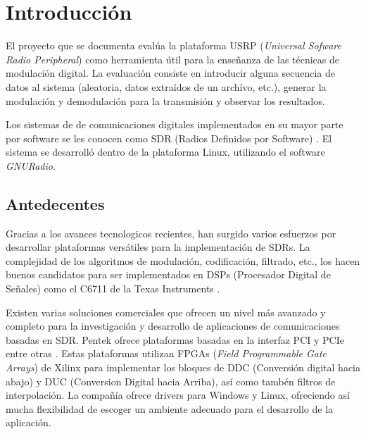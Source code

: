 \chapter{Introducci\'on}

El proyecto que se documenta eval\'ua la plataforma USRP (\emph{Universal Sofware Radio Peripheral}) como herramienta \'util
para la ense\~nanza de las t\'ecnicas de modulaci\'on digital. La evaluaci\'on consiste en introducir alguna secuencia de
datos al sistema (aleatoria, datos extra\'idos de un arch\'ivo, etc.), generar la modulaci\'on y demodulaci\'on para la
transmisi\'on y observar los resultados.

Los sistemas de de comunicaciones digitales implementados en su  mayor parte por software se les conocen como SDR (Radios
Definidos por Software) \cite{mitola}. El sistema se desarroll\'o dentro de la plataforma Linux, utilizando el software
\emph{GNURadio}.

\section{Antedecentes}

Gracias a los avances tecnologicos recientes, han surgido varios esfuerzos por desarrollar plataformas vers\'atiles para la
implementaci\'on de SDRs. La complejidad de los algoritmos de modulaci\'on, codificaci\'on, filtrado, etc., los hacen buenos
candidatos para ser implementados en DSPs (Procesador Digital de Se\~nales) como el C6711 de la Texas Instruments
\cite{abendroth}.

Existen varias soluciones comerciales que ofrecen un nivel m\'as avanzado y completo para la investigaci\'on y desarrollo de
aplicaciones de comunicaciones basadas en SDR. Pentek ofrece plataformas basadas en la interfaz PCI y PCIe entre otras
\cite{pentek}. Estas plataformas utilizan FPGAs (\emph{Field Programmable Gate Arrays}) de Xilinx para implementar los
bloques de DDC (Conversi\'on digital hacia abajo) y DUC (Conversion Digital hacia Arriba), as\'i como tamb\'en filtros de
interpolaci\'on. La compa\~n\'ia ofrece drivers para Windows y Linux, ofreciendo as\'i mucha flexibilidad de escoger un
ambiente adecuado para el desarrollo de la aplicaci\'on.

